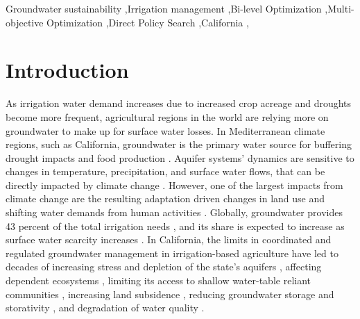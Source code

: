 \documentclass[a4paper,fleqn]{cas-sc}
\begin{document}
\begin{keywords}
Groundwater sustainability \sep Irrigation management \sep Bi-level Optimization \sep Multi-objective Optimization \sep Direct Policy Search \sep California \sep 
\end{keywords}


\maketitle

\section{Introduction}\label{sct:1}

As irrigation water demand increases due to increased crop acreage and droughts become more frequent, agricultural regions in the world are relying more on groundwater to make up for surface water losses. In Mediterranean climate regions, such as California, groundwater is the primary water source for buffering drought impacts and food production \citep{malmgren_groundwater_2022,priyan_issues_2021}. Aquifer systems’ dynamics are sensitive to changes in temperature, precipitation, and surface water flows, that can be directly impacted by climate change \citep{cuthbert_global_2019,wu_divergent_2020}. However, one of the largest impacts from climate change are the resulting adaptation driven changes in land use and shifting water demands from human activities \citep{taylor_ground_2013}. Globally, groundwater provides 43 percent of the total irrigation needs \citep{siebert_groundwater_2010}, and its share is expected to increase as surface water scarcity increases \citep{wada_nonsustainable_2012}. In California, the limits in coordinated and regulated groundwater management in irrigation-based agriculture have led to decades of increasing stress and depletion of the state's aquifers \citep{vasco_satellite-based_2019}, affecting dependent ecosystems \citep{bierkens_non-renewable_2019}, limiting its access to shallow water-table reliant communities \citep{pauloo_domestic_2020,perrone_dry_2017}, increasing land subsidence \citep{smith_groundwater_2020}, reducing groundwater storage and storativity \citep{alam_post-drought_2021}, and degradation of water quality \citep{levy_critical_2021}. 
\end{document}
